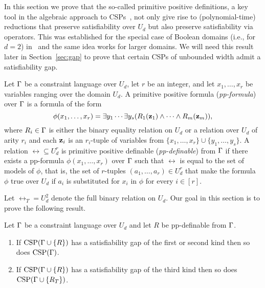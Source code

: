 In this section we prove that the so-called primitive positive definitions, a key tool in the
algebraic approach to CSPs~\cite{Bulatov05:classifying}, not only give rise to
(polynomial-time) reductions that preserve satisfiability over $U_d$ but also
preserve satisfiability via operators. This was
established for the special case of Boolean domains (i.e., for $d=2$)
in~\cite{AKS19:jcss} and the same idea works for larger domains. We will need
this result later in Section~\ref{sec:gap} to prove that certain CSPs of 
unbounded width admit a satisfiability gap.

Let $\Gamma$ be a constraint language over $U_d$, let $r$ be an integer, and
let $x_1,\ldots,x_r$ be variables ranging over the domain $U_d$. A primitive
positive formula (\emph{pp-formula}) over $\Gamma$ is a formula of the form
%
\begin{equation}\label{eq:pp-formula}
  \phi(x_1,\ldots,x_r)=\exists y_1\cdots\exists y_s(R_1({\bf z}_1)\wedge\cdots\wedge
  R_m({\bf z}_m)),
\end{equation}
%
where $R_i\in\Gamma$ is either the binary equality relation on $U_d$ or a relation over $U_d$ of arity $r_i$ and each ${\bf z}_i$ is an $r_i$-tuple of variables from
$\{x_1,\ldots,x_r\}\cup\{y_1,\ldots,y_s\}$.
%
A relation $\rel\subseteq U_d^r$ is primitive positive definable
(\emph{pp-definable}) from $\Gamma$ if there
exists a pp-formula $\phi(x_1,\ldots,x_r)$ over $\Gamma$ such that $\rel$ is equal to the set of
models of $\phi$, that is, the set of $r$-tuples $(a_1,\ldots,a_r)\in U_d^r$
that make the formula $\phi$ true over $U_d$ if $a_i$ is
substituted for $x_i$ in $\phi$ for every $i\in [r]$.

Let $\rel_T=U_d^2$ denote the full binary relation on $U_d$.
%
Our goal in this section is to prove the following result.

\begin{theorem}\label{the:pp}
  Let $\Gamma$ be a constraint language over $U_d$ and let $R$ be pp-definable from
  $\Gamma$.
  \begin{enumerate}
    \item If ${\rm CSP}(\Gamma\cup\{R\})$ has a satisfiability gap of the first or second kind then so does ${\rm CSP}(\Gamma)$.
    \item If ${\rm CSP}(\Gamma\cup\{R\})$ has a satisfiability gap of the third kind then so does ${\rm CSP}(\Gamma\cup\{R_T\})$.
  \end{enumerate}
\end{theorem}

